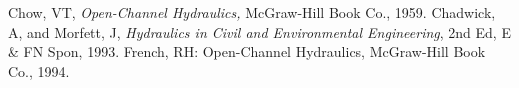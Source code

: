 \documentclass[a4paper, 12pt, british]{article} %
\numberwithin{equation}{section}
\numberwithin{figure}{section}
\numberwithin{table}{section}
\begin{document}
\begin{thebibliography}{99}
 Chow, VT, \emph{Open-Channel Hydraulics,} McGraw-Hill Book Co., 1959.
 Chadwick, A, and Morfett, J, \emph{Hydraulics in Civil and Environmental Engineering}, 2nd Ed, E \& FN Spon, 1993.
	French, RH: Open-Channel Hydraulics, McGraw-Hill Book Co., 1994.
\end{thebibliography}
\end{document}
